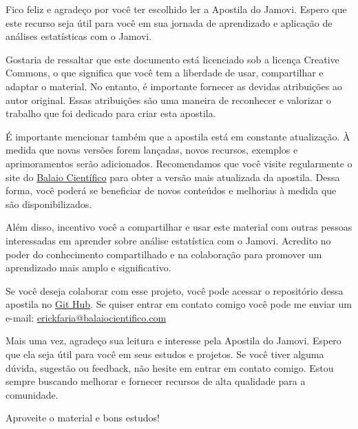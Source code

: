 
Fico feliz e agradeço por você ter escolhido ler a Apostila do Jamovi. Espero que este recurso seja útil para você em sua jornada de aprendizado e aplicação de análises estatísticas com o Jamovi.

Gostaria de ressaltar que este documento está licenciado sob a licença Creative Commons, o que significa que você tem a liberdade de usar, compartilhar e adaptar o material. No entanto, é importante fornecer as devidas atribuições ao autor original. Essas atribuições são uma maneira de reconhecer e valorizar o trabalho que foi dedicado para criar esta apostila.

É importante mencionar também que a apostila está em constante atualização. À medida que novas versões forem lançadas, novos recursos, exemplos e aprimoramentos serão adicionados. Recomendamos que você visite regularmente o site do \href{https://www.balaiocientifico.com/jamovi/apostila-de-jamovi/} {Balaio Científico} para obter a versão mais atualizada da apostila. Dessa forma, você poderá se beneficiar de novos conteúdos e melhorias à medida que são disponibilizados.

Além disso, incentivo você a compartilhar e usar este material com outras pessoas interessadas em aprender sobre análise estatística com o Jamovi. Acredito no poder do conhecimento compartilhado e na colaboração para promover um aprendizado mais amplo e significativo.

Se você deseja colaborar com esse projeto, você pode acessar o repositório dessa apostila no \href{https://github.com/balaio-cientifico/apostila_jamovi}{Git Hub}. Se quiser entrar em contato comigo você pode me enviar um e-mail: \href{mailto:erickfaria@balaiocientifico.com}{erickfaria@balaiocientifico.com}

Mais uma vez, agradeço sua leitura e interesse pela Apostila do Jamovi. Espero que ela seja útil para você em seus estudos e projetos. Se você tiver alguma dúvida, sugestão ou feedback, não hesite em entrar em contato comigo. Estou sempre buscando melhorar e fornecer recursos de alta qualidade para a comunidade.

Aproveite o material e bons estudos!

